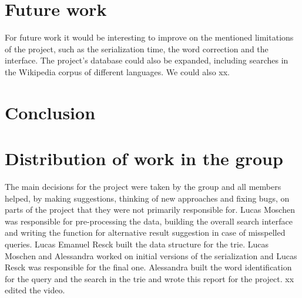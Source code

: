 \documentclass{article}
\begin{document}
\section*{Future work}
For future work it would be interesting to improve on the mentioned limitations of the project, such as the serialization time, the word correction and the interface. The project's database could also be expanded, including searches in the Wikipedia corpus of different languages. We could also xx. 

\section*{Conclusion}

\section*{Distribution of work in the group}
The main decisions for the project were taken by the group and all members helped, by making suggestions, thinking of new approaches and fixing bugs, on parts of the project that they were not primarily responsible for. Lucas Moschen was responsible for pre-processing the data, building the overall search interface and writing the function for alternative result suggestion in case of misspelled queries. Lucas Emanuel Resck built the data structure for the trie. Lucas Moschen and Alessandra worked on initial versions of the serialization and Lucas Resck was responsible for the final one. Alessandra built the word identification for the query and the search in the trie and wrote this report for the project. xx edited the video.

\end{document}
